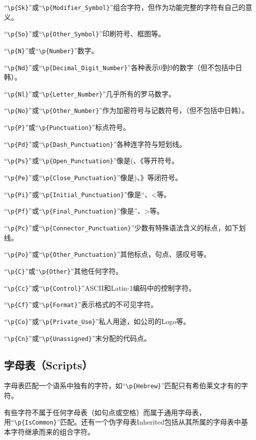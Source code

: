 “\verb|\p{Sk}|”或“\verb|\p{Modifier_Symbol}|”组合字符，但作为功能完整的字符有自己的意义。

“\verb|\p{So}|”或“\verb|\p{Other_Symbol}|”印刷符号、框图等。

“\verb|\p{N}|”或“\verb|\p{Number}|”数字。

“\verb|\p{Nd}|”或“\verb|\p{Decimal_Digit_Number}|”各种表示0到9的数字（但不包括中日韩）。

“\verb|\p{Nl}|”或“\verb|\p{Letter_Number}|”几乎所有的罗马数字。

“\verb|\p{No}|”或“\verb|\p{Other_Number}|”作为加密符号与记数符号，（但不包括中日韩）。

“\verb|\p{P}|”或“\verb|\p{Punctuation}|”标点符号。

“\verb|\p{Pd}|”或“\verb|\p{Dash_Punctuation}|”各种连字符与短划线。

“\verb|\p{Ps}|”或“\verb|\p{Open_Punctuation}|”像是(、《等开符号。

“\verb|\p{Pe}|”或“\verb|\p{Close_Punctuation}|”像是)、》等闭符号。

“\verb|\p{Pi}|”或“\verb|\p{Initial_Punctuation}|”像是“、<等。

“\verb|\p{Pf}|”或“\verb|\p{Final_Punctuation}|”像是”、>等。

“\verb|\p{Pc}|”或“\verb|\p{Connector_Punctuation}|”少数有特殊语法含义的标点，如下划线。

“\verb|\p{Po}|”或“\verb|\p{Other_Punctuation}|”其他标点，句点、感叹号等。

“\verb|\p{C}|”或“\verb|\p{Other}|”其他任何字符。

“\verb|\p{Cc}|”或“\verb|\p{Control}|”ASCII和Latin-1编码中的控制字符。

“\verb|\p{Cf}|”或“\verb|\p{Format}|”表示格式的不可见字符。

“\verb|\p{Co}|”或“\verb|\p{Private_Use}|”私人用途，如公司的Logo等。

“\verb|\p{Cn}|”或“\verb|\p{Unassigned}|”末分配的代码点。

\subsection{字母表（Scripts）}

字母表匹配一个语系中独有的字符，如“\verb|\p{Hebrew}|”匹配只有希伯莱文才有的字符。

有些字符不属于任何字母表（如句点或空格）而属于通用字母表，用“\verb|\p{IsCommon}|”匹配。还有一个伪字母表Inherited包括从其所属的字母表中基本字符继承而来的组合字符。


